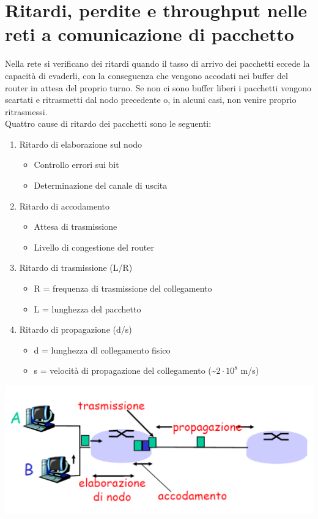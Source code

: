 \documentclass{report}
\begin{document}
	\section{Ritardi, perdite e throughput nelle reti a comunicazione di pacchetto}
	Nella rete si verificano dei ritardi quando il tasso di arrivo dei pacchetti eccede la capacità di evaderli, con la conseguenza che vengono accodati nei buffer del router in attesa del proprio turno. Se non ci sono buffer liberi i pacchetti vengono scartati e ritrasmetti dal nodo precedente o, in alcuni casi, non venire proprio ritrasmessi.
	\medskip\\ Quattro cause di ritardo dei pacchetti sono le seguenti:
	\begin{enumerate}
		\item Ritardo di elaborazione sul nodo
		\begin{itemize}
			\item Controllo errori sui bit
			\item Determinazione del canale di uscita
		\end{itemize}
		\item Ritardo di accodamento
		\begin{itemize}
			\item Attesa di trasmissione
			\item Livello di congestione del router
		\end{itemize}
		\item Ritardo di trasmissione (L/R)
		\begin{itemize}
			\item R = frequenza di trasmissione del collegamento
			\item L = lunghezza del pacchetto
		\end{itemize}
		\item Ritardo di propagazione (d/s)
		\begin{itemize}
			\item d = lunghezza dl collegamento fisico 
			\item s = velocità di propagazione del collegamento (\textasciitilde \(2 \cdot 10^8\) m/s)
		\end{itemize}
	\end{enumerate}
	\begin{center}
		\includegraphics[width=0.7\linewidth]{ritardi.png}
	\end{center}
\end{document}
